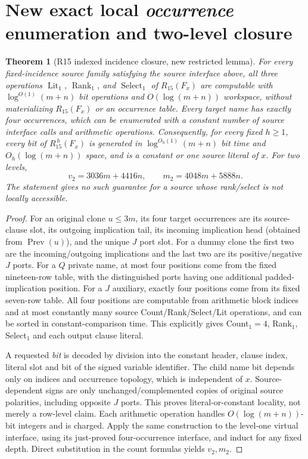 \documentclass[11pt]{article}
\newtheorem{theorem}{Theorem}
\begin{document}
\section{New exact local \emph{occurrence} enumeration and two-level closure}
\begin{theorem}[R15 indexed incidence closure, new restricted lemma]
For every fixed-incidence source family satisfying the source interface above, all three operations $\operatorname{Lit}_1$, $\operatorname{Rank}_1$, and $\operatorname{Select}_1$ of $R_{15}(F_x)$ are computable with $\log^{O(1)}(m+n)$ bit operations and $O(\log(m+n))$ workspace, without materializing $R_{15}(F_x)$ or an occurrence table. Every target name has \emph{exactly four} occurrences, which can be enumerated with a constant number of source interface calls and arithmetic operations. Consequently, for every fixed $h\ge1$, every bit of $R_{15}^{\,h}(F_x)$ is generated in $\log^{O_h(1)}(m+n)$ bit time and $O_h(\log(m+n))$ space, and is a constant or one source literal of $x$. For two levels,
\[
\boxed{v_2=3036m+4416n,\qquad m_2=4048m+5888n.}
\]
The statement gives no such guarantee for a source whose rank/select is not locally accessible.
\end{theorem}
\begin{proof}
For an original clone $u\le3m$, its four target occurrences are its source-clause slot, its outgoing implication tail, its incoming implication head (obtained from $\operatorname{Prev}(u)$), and the unique $J$ port slot. For a dummy clone the first two are the incoming/outgoing implications and the last two are its positive/negative $J$ ports. For a $Q$ private name, at most four positions come from the fixed nineteen-row table, with the distinguished ports having one additional padded-implication position. For a $J$ auxiliary, exactly four positions come from its fixed seven-row table. All four positions are computable from arithmetic block indices and at most constantly many source Count/Rank/Select/Lit operations, and can be sorted in constant-comparison time. This explicitly gives Count$_1=4$, Rank$_1$, Select$_1$ and each output clause literal.

A requested \emph{bit} is decoded by division into the constant header, clause index, literal slot and bit of the signed variable identifier. The child name bit depends only on indices and occurrence topology, which is independent of $x$. Source-dependent signs are only unchanged/complemented copies of original source polarities, including opposite $J$ ports. This proves literal-or-constant locality, not merely a row-level claim. Each arithmetic operation handles $O(\log(m+n))$-bit integers and is charged. Apply the same construction to the level-one virtual interface, using its just-proved four-occurrence interface, and induct for any fixed depth. Direct substitution in the count formulas yields $v_2,m_2$.
\end{proof}
\end{document}
